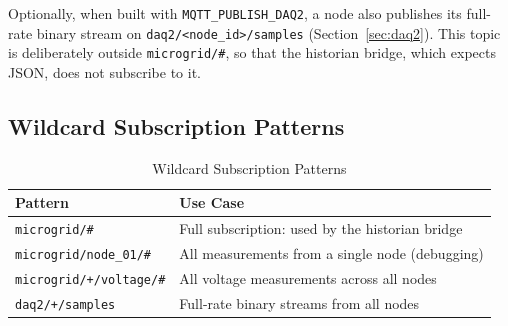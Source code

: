 Optionally, when built with \texttt{MQTT\_PUBLISH\_DAQ2}, a node also publishes its full-rate binary stream on \texttt{daq2/<node\_id>/samples} (Section~\ref{sec:daq2}). This topic is deliberately outside \texttt{microgrid/\#}, so that the historian bridge, which expects JSON, does not subscribe to it.

\subsection{Wildcard Subscription Patterns}
\begin{table}[H]
  \caption{Wildcard Subscription Patterns}
  \centering
  \begin{tabular}{ll}
      \hline
      \textbf{Pattern} & \textbf{Use Case} \\
      \hline
      \texttt{microgrid/\#} & Full subscription: used by the historian bridge \\
      \texttt{microgrid/node\_01/\#} & All measurements from a single node (debugging) \\
      \texttt{microgrid/+/voltage/\#} & All voltage measurements across all nodes \\
      \texttt{daq2/+/samples} & Full-rate binary streams from all nodes \\
      \hline
    \end{tabular}
\end{table}
